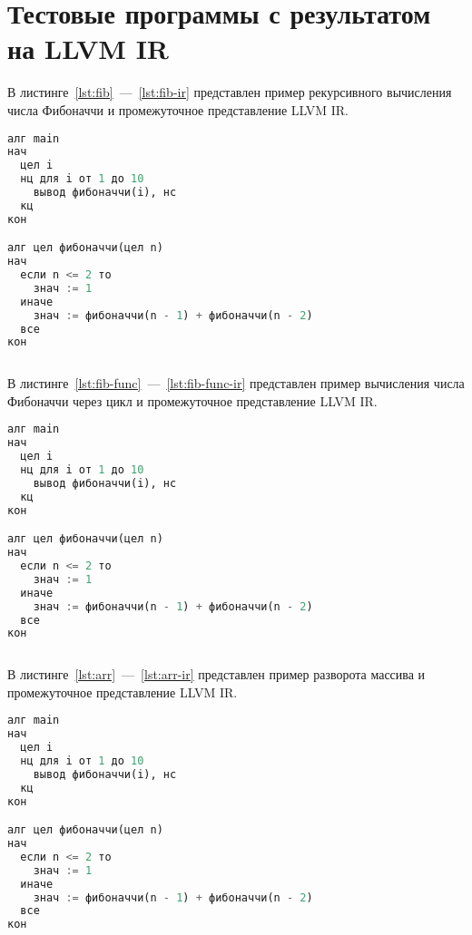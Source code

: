 \section{Тестовые программы с результатом на LLVM IR}
\label{appendix:c}

В листинге~\ref{lst:fib}~---~\ref{lst:fib-ir} представлен пример рекурсивного вычисления числа Фибоначчи и промежуточное представление LLVM IR.

\begin{lstlisting}[language=sql, caption={Пример рекурсивного вычисления числа Фибоначчи}, label=lst:fib]
алг main
нач
  цел i
  нц для i от 1 до 10
    вывод фибоначчи(i), нс
  кц
кон

алг цел фибоначчи(цел n)
нач
  если n <= 2 то
    знач := 1
  иначе
    знач := фибоначчи(n - 1) + фибоначчи(n - 2)
  все
кон
\end{lstlisting}

\begin{lstlisting}[language=sql, caption={Пример промежуточного представления LLVM IR для вычисления числа Фибоначчи}, label=lst:fib-ir]

\end{lstlisting}

В листинге~\ref{lst:fib-func}~---~\ref{lst:fib-func-ir} представлен пример вычисления числа Фибоначчи через цикл и промежуточное представление LLVM IR.

\begin{lstlisting}[language=sql, caption={Пример вычисления числа Фибоначчи через цикл}, label=lst:fib-func]
алг main
нач
  цел i
  нц для i от 1 до 10
    вывод фибоначчи(i), нс
  кц
кон

алг цел фибоначчи(цел n)
нач
  если n <= 2 то
    знач := 1
  иначе
    знач := фибоначчи(n - 1) + фибоначчи(n - 2)
  все
кон
\end{lstlisting}

\begin{lstlisting}[language=sql, caption={Пример промежуточного представления LLVM IR для вычисления числа Фибоначчи через цикл}, label=lst:fib-func-ir]

\end{lstlisting}


В листинге~\ref{lst:arr}~---~\ref{lst:arr-ir} представлен пример разворота массива и промежуточное представление LLVM IR.

\begin{lstlisting}[language=sql, caption={Пример развтора массива}, label=lst:arr]
алг main
нач
  цел i
  нц для i от 1 до 10
    вывод фибоначчи(i), нс
  кц
кон

алг цел фибоначчи(цел n)
нач
  если n <= 2 то
    знач := 1
  иначе
    знач := фибоначчи(n - 1) + фибоначчи(n - 2)
  все
кон
\end{lstlisting}

\begin{lstlisting}[language=sql, caption={Пример промежуточного представления LLVM IR для разворота массива}, label=lst:arr-ir]

\end{lstlisting}

\newpage